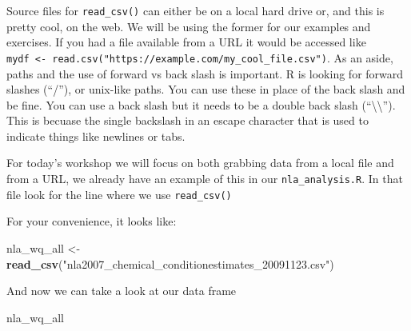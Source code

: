\documentclass[]{article}
\newenvironment{Shaded}{\begin{snugshade}}{\end{snugshade}}
\newcommand{\KeywordTok}[1]{\textcolor[rgb]{0.13,0.29,0.53}{\textbf{#1}}}
\newcommand{\NormalTok}[1]{#1}
\newcommand{\StringTok}[1]{\textcolor[rgb]{0.31,0.60,0.02}{#1}}
\begin{document}
Source files for \texttt{read\_csv()} can either be on a local hard
drive or, and this is pretty cool, on the web. We will be using the
former for our examples and exercises. If you had a file available from
a URL it would be accessed like
\texttt{mydf\ \textless{}-\ read.csv("https://example.com/my\_cool\_file.csv")}.
As an aside, paths and the use of forward vs back slash is important. R
is looking for forward slashes (``/''), or unix-like paths. You can use
these in place of the back slash and be fine. You can use a back slash
but it needs to be a double back slash
(``\textbackslash\textbackslash{}''). This is becuase the single
backslash in an escape character that is used to indicate things like
newlines or tabs.

For today's workshop we will focus on both grabbing data from a local
file and from a URL, we already have an example of this in our
\texttt{nla\_analysis.R}. In that file look for the line where we use
\texttt{read\_csv()}

For your convenience, it looks like:

\begin{Shaded}
\begin{Highlighting}[]
\NormalTok{nla_wq_all <-}\StringTok{ }\KeywordTok{read_csv}\NormalTok{(}\StringTok{"nla2007_chemical_conditionestimates_20091123.csv"}\NormalTok{)}
\end{Highlighting}
\end{Shaded}

And now we can take a look at our data frame

\begin{Shaded}
\begin{Highlighting}[]
\NormalTok{nla_wq_all}
\end{Highlighting}
\end{Shaded}
\end{document}
